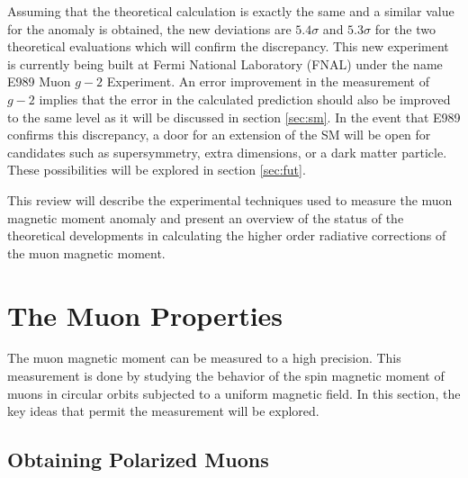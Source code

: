 \documentclass{outhesis}
\begin{document}
Assuming that the theoretical calculation is exactly the same and a similar value for the anomaly is obtained, the new deviations are $5.4\sigma$ and $5.3\sigma$ for the two theoretical evaluations which will confirm the discrepancy. This new experiment is currently being built at Fermi National Laboratory (FNAL) under the name E989 Muon $g-2$ Experiment. An error improvement in the measurement of $g-2$ implies that the error in the calculated prediction should also be improved to the same level as it will be discussed in section \ref{sec:sm}.
In the event that E989 confirms this discrepancy, a door for an extension of the SM will be open for candidates such as supersymmetry, extra dimensions, or a dark matter particle. These possibilities will be explored in section \ref{sec:fut}.

This review will describe the experimental techniques used to measure the muon magnetic moment anomaly and present an overview of the status of the theoretical developments in calculating the higher order radiative corrections of the muon magnetic moment.  


\section{The Muon Properties}

The muon magnetic moment can be measured to a high precision. This measurement is done by studying the behavior of the spin magnetic moment of muons in circular orbits subjected to a uniform magnetic field. In this section, the key ideas that permit the measurement will be explored. 



\subsection{Obtaining Polarized Muons}
\end{document}
